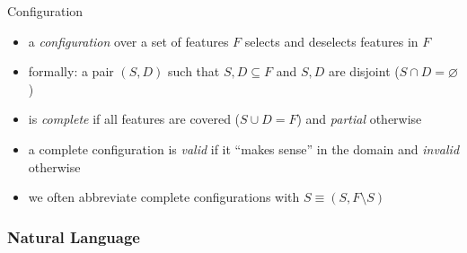 \begin{frame}{\myframetitle}
	\begin{fancycolumns}
		\begin{definition}{Configuration}
			\begin{itemize}
				\item a \emph{configuration}  over a set of features $F$ selects and deselects features in $F$
				\item formally: a pair $(S, D)$ such that $S, D \subseteq F$ and $S, D$ are disjoint ($S \cap D = \varnothing$)
				\item is \emph{complete}  if all features are covered ($S \cup D = F$) and \emph{partial}  otherwise
				\item a complete configuration is \emph{valid}  if it ``makes sense'' in the domain and \emph{invalid}  otherwise %
				\item we often abbreviate complete configurations with $S \equiv (S, F \setminus S)$
			\end{itemize}
		\end{definition}
	\nextcolumn
	\end{fancycolumns}
\end{frame}

\subsubsection{Natural Language}

